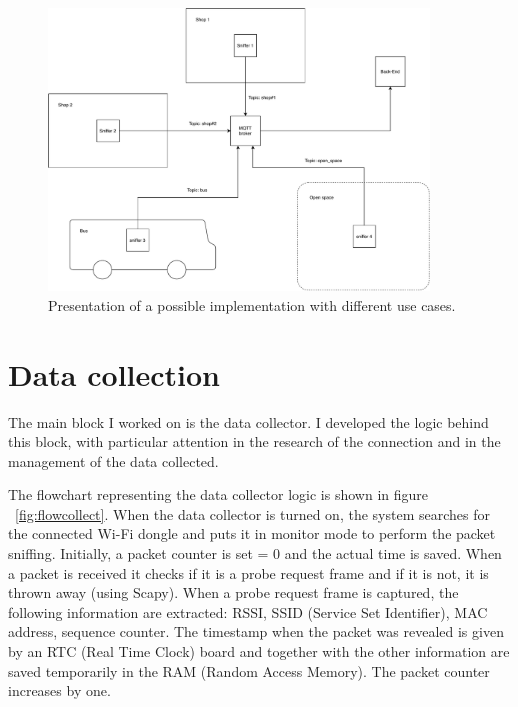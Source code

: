 \begin{figure}[h]
\centering 
\includegraphics[width=0.9\textwidth]{images/excases} 
\caption{Presentation of a possible implementation with different use cases.}
\label{fig:excases}
\end{figure}


\section{Data collection}
\label{sec:collection}
\vspace{0.2 cm} 

The main block I worked on is the data collector. I developed the logic behind this block, with particular attention in the research of the connection and in the management of the data collected.

The flowchart representing the data collector logic is shown in figure ~\ref{fig:flowcollect}. When the data collector is turned on, the system searches for the connected Wi-Fi dongle and puts it in monitor mode to perform the packet sniffing. Initially, a packet counter is set = 0 and the actual time is saved. When a packet is received it checks if it is a probe request frame and if it is not, it is thrown away (using Scapy).
When a probe request frame is captured, the following information are extracted: RSSI, SSID (Service Set Identifier), MAC address, sequence counter. The timestamp when the packet was revealed is given by an RTC (Real Time Clock) board and together with the other information are saved temporarily in the RAM (Random Access Memory). The packet counter increases by one.

